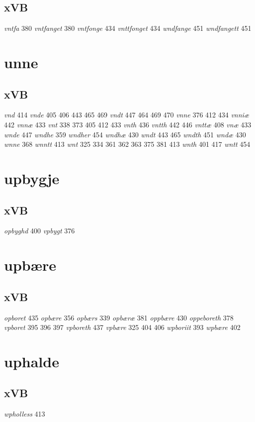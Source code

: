 \documentclass[a4paper,twocolumn]{article}
\begin{document}
\subsection{xVB}
\label{sec:org39b9e47}
\emph{vntfa} 380 \emph{vntfanget} 380 \emph{vntfonge} 434 \emph{vnttfonget} 434 \emph{wndfange} 451 \emph{wndfangett} 451 
\section{unne}
\label{sec:org9672570}
\subsection{xVB}
\label{sec:orgd794379}
\emph{vnd} 414 \emph{vnde} 405 406 443 465 469 \emph{vndt} 447 464 469 470 \emph{vnne} 376 412 434 \emph{vnniæ} 442 \emph{vnnæ} 433 \emph{vnt} 338 373 405 412 433 \emph{vnth} 436 \emph{vntth} 442 446 \emph{vnttæ} 408 \emph{vnæ} 433 \emph{wnde} 447 \emph{wndhe} 359 \emph{wndher} 454 \emph{wndhæ} 430 \emph{wndt} 443 465 \emph{wndth} 451 \emph{wndæ} 430 \emph{wnne} 368 \emph{wnntt} 413 \emph{wnt} 325 334 361 362 363 375 381 413 \emph{wnth} 401 417 \emph{wntt} 454 
\section{upbygje}
\label{sec:org4ab3da8}
\subsection{xVB}
\label{sec:org451d003}
\emph{opbyghd} 400 \emph{vpbygt} 376 
\section{upbære}
\label{sec:org7a1fea0}
\subsection{xVB}
\label{sec:org51551b7}
\emph{opboret} 435 \emph{opbære} 356 \emph{opbærs} 339 \emph{opbæræ} 381 \emph{oppbære} 430 \emph{oppeboreth} 378 \emph{vpboret} 395 396 397 \emph{vpboreth} 437 \emph{vpbære} 325 404 406 \emph{wpboriit} 393 \emph{wpbære} 402 
\section{uphalde}
\label{sec:org090f66a}
\subsection{xVB}
\label{sec:org272d8d7}
\emph{wpholless} 413 
\end{document}
